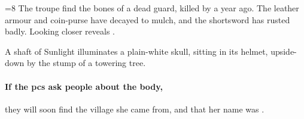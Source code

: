 \ifnum\value{r12}=8
The troupe find the bones of a dead \gls{guard}, killed by  a year ago.
The leather armour and coin-purse have decayed to mulch, and the shortsword has rusted badly.
Looking closer reveals \lootSmall.

\begin{boxtext}
  A shaft of Sunlight illuminates a plain-white skull, sitting in its helmet, upside-down by the stump of a towering tree.
\end{boxtext}

\paragraph{If the \glspl{pc} ask people about the body,}
they will soon find the \gls{village} she came from, and that her name was \composeHumanName.

\fi
